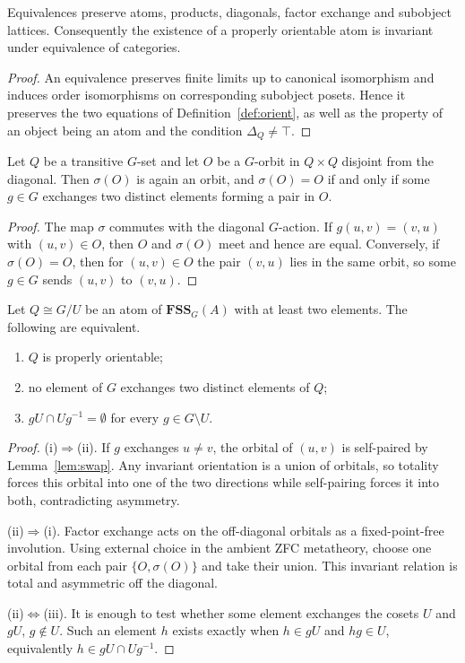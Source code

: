 \documentclass{lmcs}
\newcommand{\FSS}{\mathbf{FSS}}
\begin{document}
\begin{lem}\label{lem:orientinv}
Equivalences preserve atoms, products, diagonals, factor exchange and
subobject lattices. Consequently the existence of a properly orientable
atom is invariant under equivalence of categories.
\end{lem}
\begin{proof}
An equivalence preserves finite limits up to canonical isomorphism and
induces order isomorphisms on corresponding subobject posets. Hence it
preserves the two equations of Definition~\ref{def:orient}, as well as the
property of an object being an atom and the condition
$\Delta_Q\neq\top$.
\end{proof}

\begin{lem}\label{lem:swap}
Let $Q$ be a transitive $G$-set and let $O$ be a $G$-orbit in
$Q\times Q$ disjoint from the diagonal. Then $\sigma(O)$ is again an
orbit, and $\sigma(O)=O$ if and only if some $g\in G$ exchanges two
distinct elements forming a pair in $O$.
\end{lem}
\begin{proof}
The map $\sigma$ commutes with the diagonal $G$-action. If
$g(u,v)=(v,u)$ with $(u,v)\in O$, then $O$ and $\sigma(O)$ meet and hence
are equal. Conversely, if $\sigma(O)=O$, then for $(u,v)\in O$ the pair
$(v,u)$ lies in the same orbit, so some $g\in G$ sends $(u,v)$ to
$(v,u)$.
\end{proof}

\begin{thm}\label{thm:orientcrit}
Let $Q\cong G/U$ be an atom of $\FSS_G(A)$ with at least two elements.
The following are equivalent.
\begin{enumerate}[label=\textup{(\roman*)}]
\item $Q$ is properly orientable;
\item no element of $G$ exchanges two distinct elements of $Q$;
\item $gU\cap Ug^{-1}=\emptyset$ for every $g\in G\setminus U$.
\end{enumerate}
\end{thm}
\begin{proof}
(i)$\Rightarrow$(ii). If $g$ exchanges $u\neq v$, the orbital of
$(u,v)$ is self-paired by Lemma~\ref{lem:swap}. Any invariant
orientation is a union of orbitals, so totality forces this orbital into
one of the two directions while self-pairing forces it into both,
contradicting asymmetry.

(ii)$\Rightarrow$(i). Factor exchange acts on the off-diagonal orbitals
as a fixed-point-free involution. Using external choice in the ambient
ZFC metatheory, choose one orbital from each pair
$\{O,\sigma(O)\}$ and take their union. This invariant relation is total
and asymmetric off the diagonal.

(ii)$\Leftrightarrow$(iii). It is enough to test whether some element
exchanges the cosets $U$ and $gU$, $g\notin U$. Such an element $h$
exists exactly when $h\in gU$ and $hg\in U$, equivalently
$h\in gU\cap Ug^{-1}$.
\end{proof}
\end{document}
